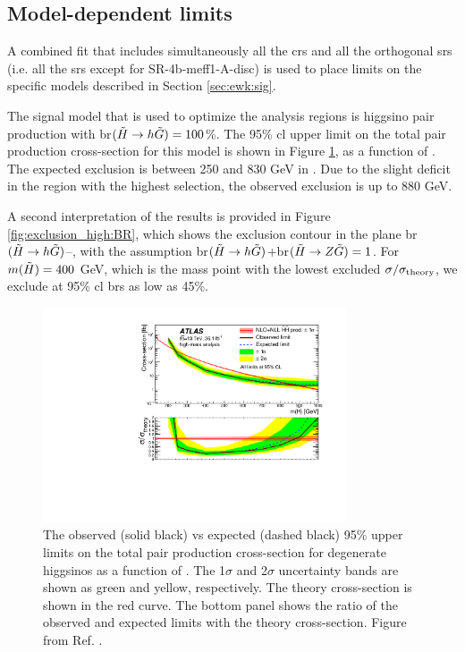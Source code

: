 \subsection{Model-dependent limits}
\label{sec:ewk:modeldep}

A combined fit that includes simultaneously all the \glspl{cr} and all the orthogonal \glspl{sr} (i.e. all the \glspl{sr}
except for SR-4b-meff1-A-disc) is used to place limits on the specific models described in Section \ref{sec:ewk:sig}.

The signal model that is used to optimize the analysis regions is higgsino pair production with \gls{br}$(\tilde{H}\rightarrow h \tilde{G})=100$\%.
The 95\% \gls{cl} upper limit on the total pair production cross-section for this model is shown in Figure \ref{fig:exclusion_high}, 
as a function of \mhino. 
The expected exclusion is between 250 and 830 GeV in \mhino. 
Due to the slight deficit in the region with the highest \meffb selection, the observed exclusion is up to 880 GeV.

A second interpretation of the results is provided in Figure \ref{fig:exclusion_high:BR}, which shows the exclusion contour in the 
plane \gls{br}$(\tilde{H}\rightarrow h \tilde{G})$--\mhino, with the assumption \gls{br}$(\tilde{H}\rightarrow h \tilde{G})$+\gls{br}$(\tilde{H}\rightarrow Z \tilde{G}) =1$.
For $m(\tilde{H}) = 400$ GeV, which is the mass point with the lowest excluded $\sigma/\sigma_{\rm theory}$, we exclude at 95\% \gls{cl}
\glspl{br} as low as 45\%.


\begin{figure}[htbp]
	\centering
	\includegraphics[width=0.8\textwidth]{figures/ewk_prod/interpretation/limit_HM}
	\caption{The observed (solid black) vs expected (dashed black) 95\% upper limits on the total pair production cross-section for degenerate higgsinos as a function of \mhino. The 1$\sigma$ and 2$\sigma$ uncertainty bands are shown as green and yellow, respectively. The theory cross-section is shown in the red curve. The bottom panel shows the ratio of the observed and expected limits with the theory cross-section. Figure from Ref. \cite{Aaboud:2018htj}.} 
	\label{fig:exclusion_high}
\end{figure}

